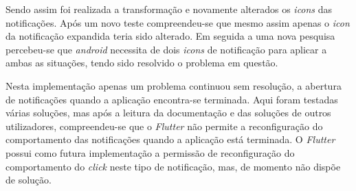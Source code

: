 Sendo assim foi realizada a transformação e novamente alterados os \textit{icons} das notificações. Após um novo teste compreendeu-se que mesmo assim apenas o \textit{icon} da notificação expandida teria sido alterado. Em seguida a uma nova pesquisa percebeu-se que \textit{android} necessita de dois \textit{icons} de notificação para aplicar a ambas as situações, tendo sido resolvido o problema em questão.

Nesta implementação apenas um problema continuou sem resolução, a abertura de notificações quando a aplicação encontra-se terminada. Aqui foram testadas várias soluções, mas após a leitura da documentação e das soluções de outros utilizadores, compreendeu-se que o \textit{Flutter} não permite a reconfiguração do comportamento das notificações quando a aplicação está terminada. O \textit{Flutter} possui como futura implementação a permissão de reconfiguração do comportamento do \textit{click} neste tipo de notificação, mas, de momento não dispõe de solução.